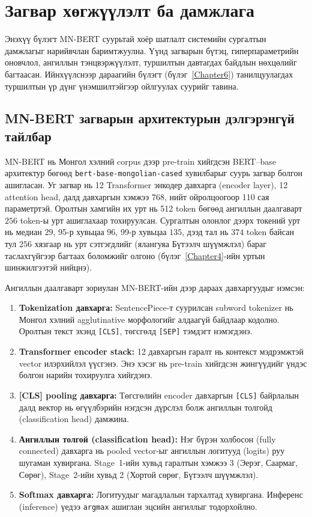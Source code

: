 ﻿%

\chapter{Загвар хөгжүүлэлт ба дамжлага}
\label{Chapter5}

Энэхүү бүлэгт MN-BERT суурьтай хоёр шатлалт системийн сургалтын дамжлагыг
нарийвчлан баримтжуулна. Үүнд загварын бүтэц, гиперпараметрийн оновчлол,
ангиллын тэнцвэржүүлэлт, туршилтын давтагдах байдлын нөхцөлийг багтаасан.
Ийнхүүлснээр дараагийн бүлэгт (бүлэг~\ref{Chapter6}) танилцуулагдах
туршилтын үр дүнг үнэмшилтэйгээр ойлгуулах суурийг тавина.

\section{MN-BERT загварын архитектурын дэлгэрэнгүй тайлбар}

MN-BERT нь Монгол хэлний corpus дээр pre-train хийгдсэн BERT--base архитектур
бөгөөд \texttt{bert-base-mongolian-cased} хувилбарыг суурь загвар болгон
ашигласан. Уг загвар нь 12 Transformer энкодер давхарга (encoder layer), 12
attention head, далд давхаргын хэмжээ 768, нийт ойролцоогоор 110 сая параметртэй.
Оролтын хамгийн их урт нь 512 token бөгөөд ангиллын даалгаварт $256$ token-ы
урт ашиглахаар тохируулсан. Сургалтын олонлог дээрх токений урт нь медиан $29$,
95-р хувьцаа $96$, 99-р хувьцаа $135$, дээд тал нь $374$ token байсан тул $256$
хязгаар нь урт сэтгэгдлийг (ялангуяа Бүтээлч шүүмжлэл) бараг таслахгүйгээр
багтаах боломжийг олгоно (бүлэг~\ref{Chapter4}-ийн уртын шинжилгээтэй нийцнэ).

Ангиллын даалгаварт зориулан MN-BERT-ийн дээр дараах давхаргуудыг нэмсэн:

\begin{enumerate}
  \item \textbf{Tokenization давхарга:} SentencePiece-т суурилсан subword tokenizer
    нь Монгол хэлний agglutinative морфологийг алдаагүй байдлаар
    кодолно. Оролтын текст эхэнд \texttt{[CLS]}, төгсгөлд \texttt{[SEP]} тэмдэгт
    нэмэгдэнэ.
  \item \textbf{Transformer encoder stack:} 12 давхаргын гаралт нь контекст мэдрэмжтэй
    vector илэрхийлэл үүсгэнэ. Энэ хэсэг нь pre-train хийгдсэн жингүүдийг үндэс
    болгон нарийн тохируулга хийгдэнэ.
  \item \textbf{[CLS] pooling давхарга:} Төгсгөлийн encoder давхаргын
    \texttt{[CLS]} байрлалын далд вектор нь өгүүлбэрийн нэгдсэн дүрслэл болж
    ангиллын толгойд (classification head) дамжина.
  \item \textbf{Ангиллын толгой (classification head):} Нэг бүрэн холбосон
    (fully connected) давхарга нь pooled vector-ыг ангиллын логитууд (logits)
    руу шугаман хувиргана. Stage~1-ийн хувьд гаралтын хэмжээ 3 (Эерэг,
    Саармаг, Сөрөг), Stage~2-ийн хувьд 2 (Хортой сөрөг, Бүтээлч шүүмжлэл).
  \item \textbf{Softmax давхарга:} Логитуудыг магадлалын тархалтад хувиргана.
    Инференс (inference) үедээ \texttt{argmax} ашиглан эцсийн ангиллыг тодорхойлно.
\end{enumerate}

